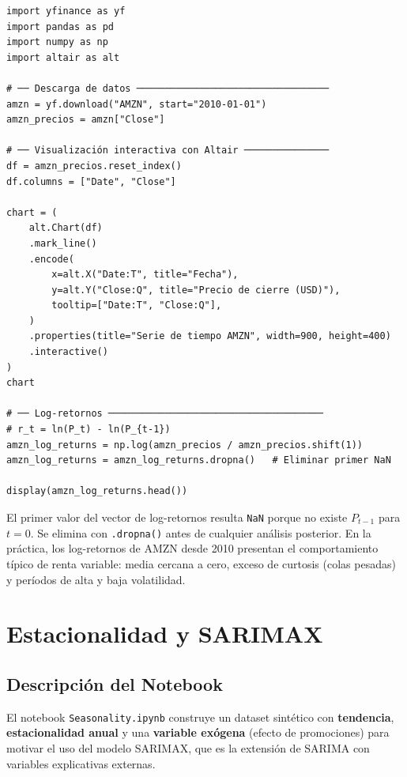 \documentclass[12pt, a4paper]{article}
\begin{document}
\begin{lstlisting}[caption={Descarga de datos y cálculo de log-retornos de AMZN}]
import yfinance as yf
import pandas as pd
import numpy as np
import altair as alt

# ── Descarga de datos ──────────────────────────────────
amzn = yf.download("AMZN", start="2010-01-01")
amzn_precios = amzn["Close"]

# ── Visualización interactiva con Altair ───────────────
df = amzn_precios.reset_index()
df.columns = ["Date", "Close"]

chart = (
    alt.Chart(df)
    .mark_line()
    .encode(
        x=alt.X("Date:T", title="Fecha"),
        y=alt.Y("Close:Q", title="Precio de cierre (USD)"),
        tooltip=["Date:T", "Close:Q"],
    )
    .properties(title="Serie de tiempo AMZN", width=900, height=400)
    .interactive()
)
chart

# ── Log-retornos ──────────────────────────────────────
# r_t = ln(P_t) - ln(P_{t-1})
amzn_log_returns = np.log(amzn_precios / amzn_precios.shift(1))
amzn_log_returns = amzn_log_returns.dropna()   # Eliminar primer NaN

display(amzn_log_returns.head())
\end{lstlisting}

\begin{nota}
  El primer valor del vector de log-retornos resulta \texttt{NaN} porque no
  existe $P_{t-1}$ para $t=0$. Se elimina con \texttt{.dropna()} antes de
  cualquier análisis posterior. En la práctica, los log-retornos de AMZN desde
  2010 presentan el comportamiento típico de renta variable: media cercana a
  cero, exceso de curtosis (colas pesadas) y períodos de alta y baja
  volatilidad.
\end{nota}

\newpage

\section{Estacionalidad y SARIMAX}

\subsection{Descripción del Notebook}

El notebook \texttt{Seasonality.ipynb} construye un dataset sintético con
\textbf{tendencia}, \textbf{estacionalidad anual} y una \textbf{variable
exógena} (efecto de promociones) para motivar el uso del modelo SARIMAX, que
es la extensión de SARIMA con variables explicativas externas.
\end{document}
